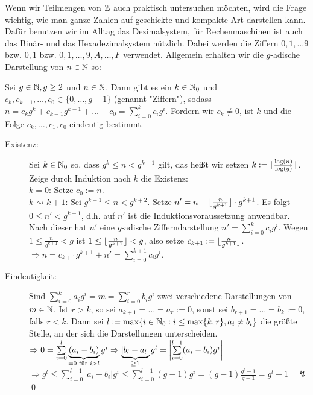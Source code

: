 Wenn wir Teilmengen von $\mathbb{Z}$ auch praktisch untersuchen möchten, wird die Frage wichtig, wie man ganze Zahlen auf geschickte und kompakte Art darstellen kann. 
Dafür benutzen wir im Alltag das Dezimalsystem, für Rechenmaschinen ist auch das Binär- und das Hexadezimalsystem nützlich. 
Dabei werden die Ziffern $0,1,\dots 9$ bzw. $0,1$ bzw. $0,1,\dots, 9, A, \dots, F$ verwendet. 
Allgemein erhalten wir die $g$-adische Darstellung von $n \in \mathbb{N}$ so:

\begin{satz}
\label{satz_g-adisch}
	Sei $g \in \mathbb{N}, g \geq 2$ und $n \in \mathbb{N}$. 
	Dann gibt es ein $k \in \mathbb{N}_0$ und $c_k, c_{k-1}, \dots, c_0 \in \{0, \dots, g-1\}$ (genannt "Ziffern"), sodass $n = c_k g^k + c_{k-1} g^{k-1} + \dots + c_0 = \sum_{i=0}^k c_i g^i$. 
	Fordern wir $c_k \neq 0$, ist $k$ und die Folge $c_k, \dots, c_1, c_0$ eindeutig bestimmt.
\end{satz}

	\begin{description}
	\item[Existenz:] Sei $k \in \mathbb{N}_0$ so, dass $g^k \leq n < g^{k+1}$ gilt, das heißt wir setzen $k := \lfloor\frac{\log(n)}{\log(g)}\rfloor$. 
	Zeige durch Induktion nach $k$ die Existenz: \\
	$k = 0$: Setze $c_0 := n$. \\
	$k \rightsquigarrow k+1$: Sei $g^{k+1} \leq n < g^{k+2}$. 
	Setze $n' = n - \lfloor\frac{n}{g^{k+1}}\rfloor \cdot g^{k+1}$. 
	Es folgt $0 \leq n' < g^{k+1}$, d.h. auf $n'$ ist die Induktionsvoraussetzung anwendbar. 
	Nach dieser hat $n'$ eine $g$-adische Zifferndarstellung $n' = \sum\limits_{i=0}^{k} c_i g^i$. 
	Wegen $1 \leq  \frac{n}{g^{k+1}} < g$ ist $1 \leq \lfloor\frac{n}{g^{k+1}}\rfloor < g$, also setze $c_{k+1} := \lfloor\frac{n}{g^{k+1}}\rfloor$. \\
	$\Rightarrow  n = c_{k+1} g^{k+1} + n' = \sum\limits_{i=0}^{k+1} c_i g^i$.
	\item[Eindeutigkeit:] Sind $\sum\limits_{i=0}^{k} a_i g^i = m = \sum\limits_{i=0}^{r} b_i g^i$ zwei verschiedene Darstellungen von $m \in \mathbb{N}$. 
	Ist $r > k$, so sei $a_{k+1} = \dots = a_r := 0$, sonst sei $b_{r+1} = \dots = b_k := 0$, falls $r < k$. 
	Dann sei $l := \max \{i \in \NN_0 : \linebreak i \leq \max\{k,r\}, a_i \neq b_i \}$ die größte Stelle, an der sich die Darstellungen unterscheiden. \\
	$\Rightarrow 0 = \sum\limits_{i=0}^l \underbrace{(a_i-b_i)}_{=0 \text{ für } i>l} g^i \Rightarrow \underbrace{|b_l - a_l|}_{\geq 1} g^l = \left\lvert\sum\limits_{i=0}^{l-1} (a_i - b_i)g^i\right\rvert$ \\
	$\Rightarrow g^l \leq \sum\limits_{i=0}^{l-1} |a_i-b_i| g^i \leq \sum\limits_{i=0}^{l-1} (g-1) g^i = (g-1) \frac{g^l - 1}{g-1} = g^l - 1 \quad \lightning$ \qed
	\end{description}


